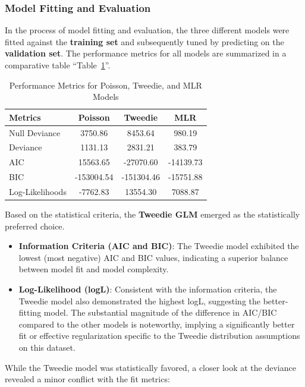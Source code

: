 \documentclass[conference]{IEEEtran}
\begin{document}
\subsubsection{\textbf{Model Fitting and Evaluation}}

In the process of model fitting and evaluation, the three different models were fitted against the \textbf{training set} and subsequently tuned by predicting on the \textbf{validation set}. The performance metrics for all models are summarized in a comparative table ``Table~\ref{model_comparison_basic}''.

\begin{table}[h]
	\centering
	\caption{Performance Metrics for Poisson, Tweedie, and MLR Models}
	\label{model_comparison_basic}
	\begin{tabular}{|l|c|c|c|}
		\hline
		\textbf{Metrics} & \textbf{Poisson} & \textbf{Tweedie} & \textbf{MLR} \\
		\hline
		Null Deviance    & 3750.86 & 8453.64 & 980.19 \\
		\hline
		Deviance         & 1131.13 & 2831.21 & 383.79 \\
		\hline
		AIC              & 15563.65 & -27070.60 & -14139.73 \\
		\hline
		BIC              & -153004.54 & -151304.46 & -15751.88 \\
		\hline
		Log-Likelihoods  & -7762.83 & 13554.30 & 7088.87 \\
		\hline
	\end{tabular}
\end{table}

Based on the statistical criteria, the \textbf{Tweedie GLM} emerged as the statistically preferred choice.
\begin{itemize}
	\item \textbf{Information Criteria (AIC and BIC)}: The Tweedie model exhibited the lowest (most negative) AIC and BIC values, indicating a superior balance between model fit and model complexity.
	\item \textbf{Log-Likelihood (logL)}: Consistent with the information criteria, the Tweedie model also demonstrated the highest logL, suggesting the better-fitting model. The substantial magnitude of the difference in AIC/BIC compared to the other models is noteworthy, implying a significantly better fit or effective regularization specific to the Tweedie distribution assumptions on this dataset.
\end{itemize}

While the Tweedie model was statistically favored, a closer look at the deviance revealed a minor conflict with the fit metrics:
\end{document}
